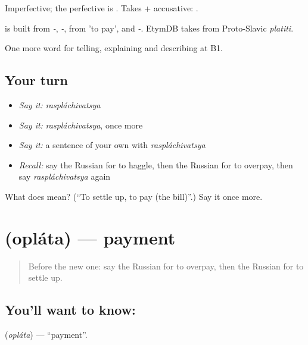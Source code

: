 Imperfective; the perfective is \emph{}. Takes \emph{} + accusative: \emph{  }.

\begin{cousinweb}
\emph{} is built from \emph{-}, \emph{-}, from \emph{} 'to pay', and \emph{-}. EtymDB takes \emph{} from Proto-Slavic \emph{platiti}.
\end{cousinweb}

\begin{grammarlens}[title={What you've built}]
One more word for telling, explaining and describing at B1.
\end{grammarlens}

\subsection*{Your turn}
\begin{itemize}
\raggedright
  \item \emph{Say it:} \emph{raspláchivatsya}
  \item \emph{Say it:} \emph{raspláchivatsya}, once more
  \item \emph{Say it:} a sentence of your own with \emph{raspláchivatsya}
  \item \emph{Recall:} say the Russian for to haggle, then the Russian for to overpay, then say \emph{raspláchivatsya} again
\end{itemize}

\begin{tcolorbox}[breakable,colback=teal!4,colframe=teal!35!black,title={Before you move on}]
What does  mean? (\textquotedblleft{}To settle up, to pay (the bill)\textquotedblright{}.) Say it once more.
\end{tcolorbox}
\section[\texorpdfstring{\ru{оплата} (opláta)}{оплата (opláta)}]{ (opláta) — payment}

\label{lesson:RU-C455-oplata}



\begin{quote}
Before the new one: say the Russian for to overpay, then the Russian for to settle up.
\end{quote}

\subsection*{You'll want to know: }
\textbf{} (\emph{opláta}) — \textquotedblleft{}payment\textquotedblright{}.

